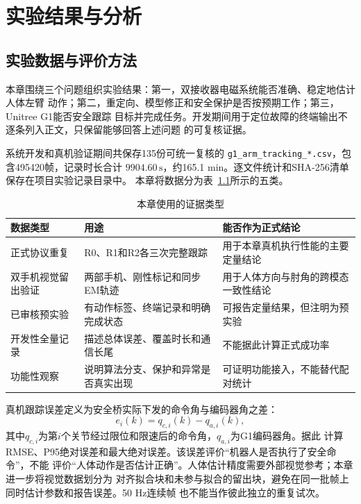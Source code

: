
\chapter{实验结果与分析}
\label{chap:experimental_results}

\section{实验数据与评价方法}
\label{sec:ch7_data_metrics}

本章围绕三个问题组织实验结果：第一，双接收器电磁系统能否准确、稳定地估计人体左臂
动作；第二，重定向、模型修正和安全保护是否按预期工作；第三，Unitree G1能否安全跟踪
目标并完成任务。开发期间用于定位故障的终端输出不逐条列入正文，只保留能够回答上述问题
的可复核证据。

系统开发和真机验证期间共保存135份可统一复核的
\texttt{g1\_arm\_tracking\_*.csv}，包含495420帧，记录时长合计
$9904.60\,\mathrm{s}$，约165.1 min。逐文件统计和SHA-256清单保存在项目实验记录目录中。
本章将数据分为表~\ref{tab:ch7_evidence_classes}所示的五类。

\begin{table}[htbp]
  \centering
  \caption{本章使用的证据类型}
  \label{tab:ch7_evidence_classes}
  \begin{tabularx}{\linewidth}{@{}lXX@{}}
    \toprule
    数据类型 & 用途 & 能否作为正式结论 \\
    \midrule
    正式协议重复 & R0、R1和R2各三次完整跟踪
      & 用于本章真机执行性能的主要定量结论 \\
    双手机视觉留出验证 & 两部手机、刚性标记和同步EM轨迹
      & 用于人体方向与肘角的跨模态一致性结论 \\
    已审核预实验 & 有动作标签、终端记录和明确完成状态
      & 可报告定量结果，但注明为预实验 \\
    开发性全量记录 & 描述总体误差、覆盖时长和通信长尾
      & 不能据此计算正式成功率 \\
    功能性观察 & 说明算法分支、保护和异常是否真实出现
      & 可证明功能接入，不能替代配对统计 \\
    \bottomrule
  \end{tabularx}
\end{table}

真机跟踪误差定义为安全桥实际下发的命令角与编码器角之差：
\begin{equation}
  e_i(k)=q_{c,i}(k)-q_{a,i}(k),
  \label{eq:ch7_tracking_error}
\end{equation}
其中$q_{c,i}$为第$i$个关节经过限位和限速后的命令角，$q_{a,i}$为G1编码器角。据此
计算RMSE、P95绝对误差和最大绝对误差。该误差评价“机器人是否执行了安全命令”，不能
评价“人体动作是否估计正确”。人体估计精度需要外部视觉参考；本章进一步将视觉数据划分为
对齐拟合块和未参与拟合的留出块，避免在同一批帧上同时估计参数和报告误差。50 Hz连续帧
也不能当作彼此独立的重复试次。

